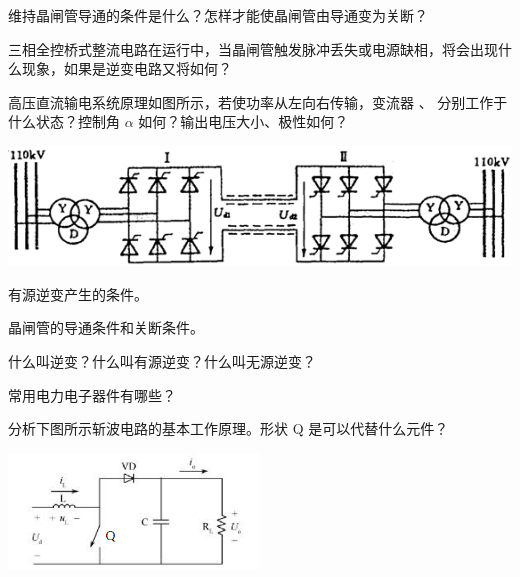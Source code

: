 \documentclass[电力电子]{subfiles}
\begin{document}
\begin{ti}[5 分]
	维持晶闸管导通的条件是什么？怎样才能使晶闸管由导通变为关断？
\end{ti}

\begin{ti}[10 分]
	三相全控桥式整流电路在运行中，当晶闸管触发脉冲丢失或电源缺相，将会出现什么现象，如果是逆变电路又将如何？
\end{ti}

\begin{ti}[10 分]
	高压直流输电系统原理如图所示，若使功率从左向右传输，变流器 、 分别工作于什么状态？控制角 $\alpha$ 如何？输出电压大小、极性如何？
	\begin{center}
		\includegraphics{figure/fig4.png}
	\end{center}
\end{ti}

\begin{ti}[5 分]
	有源逆变产生的条件。
\end{ti}

\begin{ti}[5 分]
	晶闸管的导通条件和关断条件。
\end{ti}

\begin{ti}[5 分]
	什么叫逆变？什么叫有源逆变？什么叫无源逆变？
\end{ti}

\begin{ti}[5 分]
	常用电力电子器件有哪些？
\end{ti}

\begin{ti}[10 分]
	分析下图所示斩波电路的基本工作原理。形状 Q 是可以代替什么元件？
	\begin{center}
		\includegraphics[width=0.5\textwidth]{figure/fig7.png}
	\end{center}
\end{ti}
\end{document}
